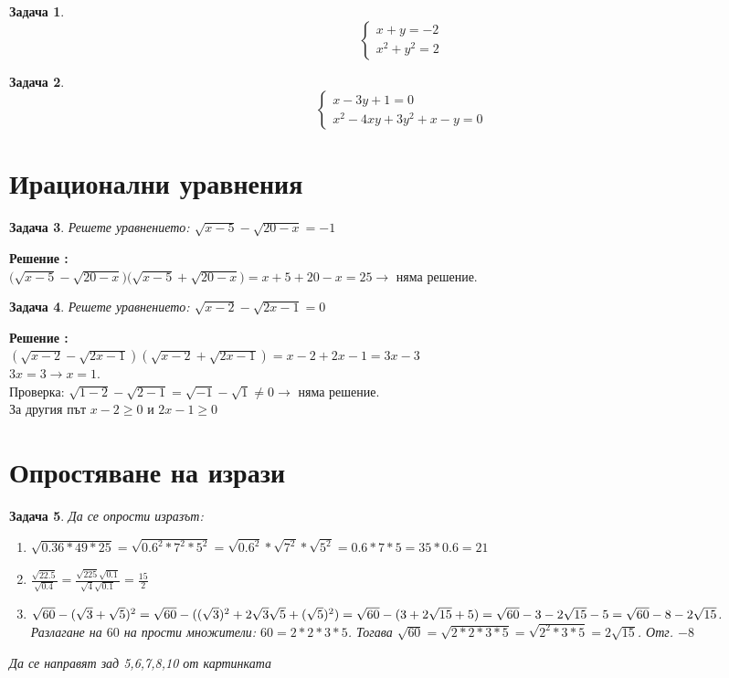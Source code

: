 \documentclass{article}
\newtheorem{problem}{Задача}
\newcounter{solution}
\newcommand\solution{%
	\stepcounter{solution}%
	\textbf{Решение :}\\%
}
\begin{document}
\begin{problem}
	\[
	\begin{cases}
	x + y = -2 \\
	x^2 + y^2 = 2 
	\end{cases}
	\]
\end{problem}

\begin{problem}
	\[
	\begin{cases}
	x - 3y + 1 = 0 \\
	x^2 - 4xy + 3y^2 + x - y = 0 
	\end{cases}
	\]
\end{problem}



\section{Ирационални уравнения}

\begin{problem}
	Решете уравнението: $\sqrt{x - 5} -  \sqrt{20-x} = -1  $
\end{problem}
\solution  $\big(\sqrt{x - 5} -  \sqrt{20-x}  \big)\big(\sqrt{x - 5} +  \sqrt{20-x}  \big) = x+5 + 20 - x  = 25 \to$ няма решение.


\begin{problem}
	Решете уравнението: $\sqrt{x - 2} -  \sqrt{2x-1} = 0  $
\end{problem}
\solution  $(\sqrt{x - 2} -  \sqrt{2x-1} )(\sqrt{x - 2} +  \sqrt{2x-1}) =  x-2 +2x - 1 = 3x - 3   
$ \\
$ 3x = 3 \to x = 1 $. \\
 Проверка:
$\sqrt{1 - 2} -  \sqrt{2-1} = \sqrt{-1} - \sqrt{1} \neq 0 \to $ няма решение. \\
За другия път $x - 2 \geq 0 $ и $ 2x-1 \geq 0 $


\section{Опростяване на изрази}

\begin{problem}
	 Да се опрости изразът:
	 \begin{enumerate}
	 	\item $\sqrt{0.36*49*25} = \sqrt{0.6^2*7^2*5^2} = \sqrt{0.6^2}*\sqrt{7^2}*\sqrt{5^2} = 0.6*7*5 = 35*0.6 = 21$
	 	\item $\frac{\sqrt{22.5}}{\sqrt{0.4}} = \frac{\sqrt {225} \sqrt {0.1}}{\sqrt4 \sqrt{0.1}} = \frac{15}{2} $
	 	\item $\sqrt{60} - (\sqrt3 + \sqrt{5})^2 = \sqrt{60} - ((\sqrt{3})^2 + 2\sqrt{3}\sqrt{5}+ (\sqrt{5})^2 ) = \\ \sqrt{60} - (3+2\sqrt{15}+5)   =\sqrt{60} - 3 - 2\sqrt{15} -5  = \sqrt{60} -8 - 2\sqrt{15}   $. \\ Разлагане на $60$ на прости множители: $60 = 2*2*3*5$. Тогава $\sqrt{60} = \sqrt{2*2*3*5} = \sqrt{2^2*3*5} = 2 \sqrt{15} $.
	 	Отг. $-8$

	 \end{enumerate}
 Да се направят зад 5,6,7,8,10 от картинката 
 
\end{problem}
\end{document}
